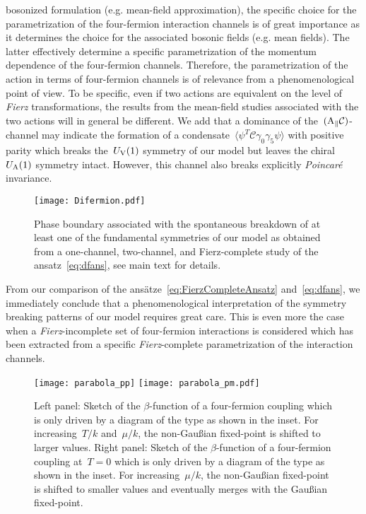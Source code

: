 \documentclass[prd,english,preprintnumbers,amsmath,amssymb,nofootinbib,twocolumn,superscriptaddress]{revtex4-1}
\def\CC{{\mathcal C}}
\begin{document}
{{{{bosonized formulation (e.g. mean-field approximation), the specific choice for the parametrization of the
four-fermion interaction channels is of great importance as it determines the choice for the associated 
bosonic fields (e.g. mean fields). The latter effectively determine a specific parametrization
of the momentum dependence of the four-fermion channels. Therefore, the parametrization of the action in terms of 
four-fermion channels is of relevance from a phenomenological
point of view. To be specific, even if two actions are equivalent on the level of {\it Fierz} transformations, the results from
the mean-field studies associated with the two actions will in general be different.}
We} add that a dominance of the~$( \text A _\parallel \CC )$-channel may indicate the formation of a 
condensate~$\langle\psi^T \CC \gamma_0 \gamma_5 \psi\rangle$ with positive parity
which breaks the~$U_{\rm V}(1)$ symmetry of our model but leaves the chiral~$U_{\rm A}(1)$ symmetry intact. However, this channel
also breaks explicitly {\it Poincar\'{e}} invariance.
%
\begin{figure}[t]
\centering
\texttt{[image: Difermion.pdf]}
\caption{Phase boundary associated with the spontaneous breakdown of at least one of the 
fundamental symmetries of our model as obtained from a one-channel, two-channel, and Fierz-complete study of
the ansatz~\eqref{eq:dfans}, see main text for details.}
\label{fig:dfpd}
\end{figure}
%

From our comparison of the ans\"atze~\eqref{eq:FierzCompleteAnsatz} and~\eqref{eq:dfans}, 
we immediately conclude that a phenomenological interpretation of the symmetry breaking patterns of our model 
requires great care. This is even more the case when a {\it Fierz}-incomplete set of four-fermion interactions is considered 
which has been extracted from a specific {\it Fierz}-complete parametrization of the interaction channels.
%
\begin{figure*}[t]
\begin{center}
  \texttt{[image: parabola\_pp]}
   \hfill
\texttt{[image: parabola\_pm.pdf]}
\end{center}
\caption{Left panel: Sketch of the $\beta$-function of a four-fermion coupling which is only driven by a diagram of the type 
as shown in the inset. For increasing~$T/k$ and~$\mu/k$, the non-Gau\ss ian fixed-point is shifted to larger values.
Right panel:  Sketch of the $\beta$-function of a four-fermion coupling at~$T=0$ which is only driven by a diagram of the type
as shown in the inset. For increasing~$\mu/k$, the non-Gau\ss ian fixed-point is shifted to smaller values and eventually merges
with the Gau\ss ian fixed-point.
}
\label{fig:pmpp}
\end{figure*}
%

}}
\end{document}
